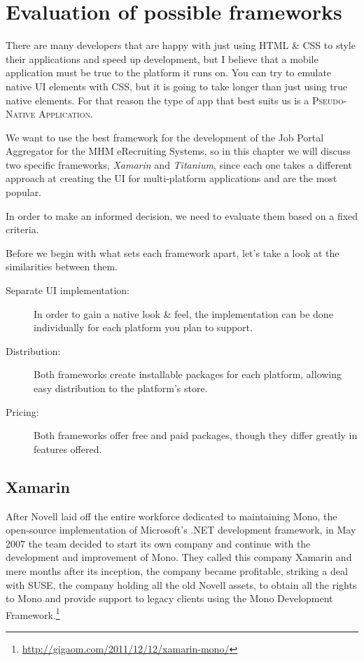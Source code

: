 \chapter{Evaluation of possible frameworks}\label{ch:evaluation}

There are many developers that are happy with just using HTML \& CSS to style their applications and speed up development, but I believe that a mobile application must be true to the platform it runs on. You can try to emulate native \ac{UI} elements with CSS, but it is going to take longer than just using true native elements. For that reason the type of app that best suits us is a \textsc{Pseudo-Native Application}. 

We want to use the best framework for the development of the Job Portal Aggregator for the MHM eRecruiting Systems, so in this chapter we will discuss two specific frameworks, \emph{Xamarin} and \emph{Titanium}, since each one takes a different approach at creating the \ac{UI} for multi-platform applications and are the most popular.

In order to make an informed decision, we need to evaluate them based on a fixed criteria.

 

Before we begin with what sets each framework apart, let's take a look at the similarities between them.

\begin{description}
\item[Separate UI implementation:] In order to gain a native look \& feel, the implementation can be done individually for each platform you plan to support.
\item[Distribution:] Both frameworks create installable packages for each platform, allowing easy distribution to the platform's store.
\item[Pricing:] Both frameworks offer free and paid packages, though they differ greatly in features offered.   
\end{description}


\section{Xamarin}
After Novell laid off the entire workforce dedicated to maintaining Mono, the open-source implementation of Microsoft's .NET development framework, in May 2007 the team decided to start its own company and continue with the development and improvement of Mono. They called this company Xamarin and mere months after its inception, the company became profitable, striking a deal with SUSE, the company holding all the old Novell assets, to obtain all the rights to Mono and provide support to legacy clients using the Mono Development Framework.\footnote{\url{http://gigaom.com/2011/12/12/xamarin-mono/}}

